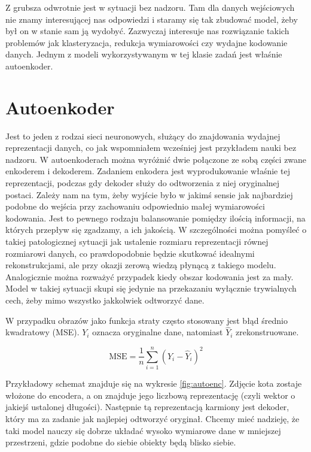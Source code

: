 Z grubsza odwrotnie jest w sytuacji bez nadzoru. Tam dla danych wejściowych nie znamy interesującej nas odpowiedzi i staramy się tak zbudować model, żeby był on w stanie sam ją wydobyć. Zazwyczaj interesuje nas rozwiązanie takich problemów jak klasteryzacja, redukcja wymiarowości czy wydajne kodowanie danych. Jednym z modeli wykorzystywanym w tej klasie zadań jest właśnie autoenkoder.

\section{Autoenkoder}

Jest to jeden z rodzai sieci neuronowych, służący do znajdowania wydajnej reprezentacji danych, co jak wspomniałem wcześniej jest przykładem nauki bez nadzoru. W autoenkoderach można wyróżnić dwie połączone ze sobą części zwane enkoderem i dekoderem. Zadaniem enkodera jest wyprodukowanie właśnie tej reprezentacji, podczas gdy dekoder służy do odtworzenia z niej oryginalnej postaci. Zależy nam na tym, żeby wyjście było w jakimś sensie jak najbardziej podobne do wejścia przy zachowaniu odpowiednio małej wymiarowości kodowania. Jest to pewnego rodzaju balansowanie pomiędzy ilością informacji, na których przepływ się zgadzamy, a ich jakością. W szczególności można pomyśleć o takiej patologicznej sytuacji jak ustalenie rozmiaru reprezentacji równej rozmiarowi danych, co prawdopodobnie będzie skutkować idealnymi rekonstrukcjami, ale przy okazji zerową wiedzą płynącą z takiego modelu. Analogicznie można rozważyć przypadek kiedy obszar kodowania jest za mały. Model w takiej sytuacji skupi się jedynie na przekazaniu wyłącznie trywialnych cech, żeby mimo wszystko jakkolwiek odtworzyć dane.


W przypadku obrazów jako funkcja straty często stosowany jest błąd średnio kwadratowy (MSE). $Y _ { i }$ oznacza oryginalne dane, natomiast $\hat { Y } _ { i }$ zrekonstruowane.

$$
\mathrm { MSE } = \frac { 1 } { n } \sum _ { i = 1 } ^ { n } \left( Y _ { i } - \hat { Y } _ { i } \right) ^ { 2 }
$$

Przykładowy schemat znajduje się na wykresie \ref{fig:autoenc}. Zdjęcie kota zostaje włożone do encodera, a on znajduje jego liczbową reprezentację (czyli wektor o jakiejś ustalonej długości). Następnie tą reprezentacją karmiony jest dekoder, który ma za zadanie jak najlepiej odtworzyć oryginał. Chcemy mieć nadzieję, że taki model nauczy się dobrze układać wysoko wymiarowe dane w mniejszej przestrzeni, gdzie podobne do siebie obiekty będą blisko siebie. 

